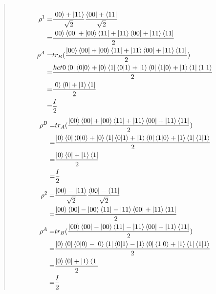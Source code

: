 \documentclass[UTF8]{ctexart}
\begin{document}
\begin{quote}
\begin{equation}
\begin{aligned}
	\end{aligned}
\end{equation}
\begin{equation}
	\begin{aligned}
		\rho^{1}=&\frac{\ket{00}+\ket{11}}{\sqrt{2}}\frac{\bra{00}+\bra{11}}{\sqrt{2}}\\
				=&\frac{\ket{00}\bra{00}+\ket{00}\bra{11}+\ket{11}\bra{00}+\ket{11}\bra{11}}{2} \\
		 \rho^{A}=&tr_{B}(\frac{\ket{00}\bra{00}+\ket{00}\bra{11}+\ket{11}\bra{00}+\ket{11}\bra{11}}{2} ) \\
				 =&\frac{ket{0}\bra{0}\bra{0}\ket{0}+\ket{0}\bra{1}\bra{0}\ket{1}+\ket{1}\bra{0}\bra{1}\ket{0}+\ket{1}\bra{1}\bra{1}\ket{1}}{2} \\
				 =&\frac{\ket{0}\bra{0}+\ket{1}\bra{1}}{2}\\
				 =&\frac{I}{2}\\
				\end{aligned}
			\end{equation}
			\begin{equation}
				\begin{aligned}
		 \rho^{B}=&tr_{A}(\frac{\ket{00}\bra{00}+\ket{00}\bra{11}+\ket{11}\bra{00}+\ket{11}\bra{11}}{2} ) \\
				 =&\frac{\ket{0}\bra{0}\bra{0}\ket{0}+\ket{0}\bra{1}\bra{0}\ket{1}+\ket{1}\bra{0}\bra{1}\ket{0}+\ket{1}\bra{1}\bra{1}\ket{1}}{2} \\
				 =&\frac{\ket{0}\bra{0}+\ket{1}\bra{1}}{2}\\
				 =&\frac{I}{2} \\
				\end{aligned}
			\end{equation}
			\begin{equation}
				\begin{aligned}
			\rho^{2}=&\frac{\ket{00}-\ket{11}}{\sqrt{2}}\frac{\bra{00}-\bra{11}}{\sqrt{2}}\\
					=&\frac{\ket{00}\bra{00}-\ket{00}\bra{11}-\ket{11}\bra{00}+\ket{11}\bra{11}}{2} \\
			\rho^{A}=&tr_{B}(\frac{\ket{00}\bra{00}-\ket{00}\bra{11}-\ket{11}\bra{00}+\ket{11}\bra{11}}{2}) \\
					=&\frac{\ket{0}\bra{0}\bra{0}\ket{0}-\ket{0}\bra{1}\bra{0}\ket{1}-\ket{1}\bra{0}\bra{1}\ket{0}+\ket{1}\bra{1}\bra{1}\ket{1}}{2}\\
					=&\frac{\ket{0}\bra{0}+\ket{1}\bra{1}}{2}\\
					=&\frac{I}{2} \\

\end{aligned}
\end{equation}
\end{quote}
\end{document}
